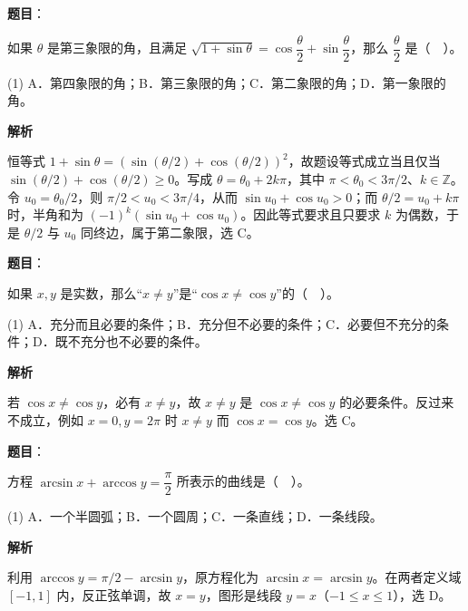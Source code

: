 \begin{answer}

\textbf{题目}：

如果 $\theta$ 是第三象限的角，且满足 $\sqrt{1+\sin\theta}=\cos\dfrac\theta2+\sin\dfrac\theta2$，那么 $\dfrac\theta2$ 是（　）。

\begin{gkopts}(1)
\task A．第四象限的角；B．第三象限的角；C．第二象限的角；D．第一象限的角。
\end{gkopts}

\textbf{解析}

恒等式 $1+\sin\theta=(\sin(\theta/2)+\cos(\theta/2))^2$，故题设等式成立当且仅当 $\sin(\theta/2)+\cos(\theta/2)\ge0$。写成 $\theta=\theta_0+2k\pi$，其中 $\pi<\theta_0<3\pi/2$、$k\in\mathbb Z$。令 $u_0=\theta_0/2$，则 $\pi/2<u_0<3\pi/4$，从而 $\sin u_0+\cos u_0>0$；而 $\theta/2=u_0+k\pi$ 时，半角和为 $(-1)^k(\sin u_0+\cos u_0)$。因此等式要求且只要求 $k$ 为偶数，于是 $\theta/2$ 与 $u_0$ 同终边，属于第二象限，选 C。


\end{answer}
\begin{answer}

\textbf{题目}：

如果 $x,y$ 是实数，那么“$x\ne y$”是“$\cos x\ne\cos y$”的（　）。

\begin{gkopts}(1)
\task A．充分而且必要的条件；B．充分但不必要的条件；C．必要但不充分的条件；D．既不充分也不必要的条件。
\end{gkopts}

\textbf{解析}

若 $\cos x\ne\cos y$，必有 $x\ne y$，故 $x\ne y$ 是 $\cos x\ne\cos y$ 的必要条件。反过来不成立，例如 $x=0,y=2\pi$ 时 $x\ne y$ 而 $\cos x=\cos y$。选 C。


\end{answer}
\begin{answer}

\textbf{题目}：

方程 $\arcsin x+\arccos y=\dfrac\pi2$ 所表示的曲线是（　）。

\begin{gkopts}(1)
\task A．一个半圆弧；B．一个圆周；C．一条直线；D．一条线段。
\end{gkopts}

\textbf{解析}

利用 $\arccos y=\pi/2-\arcsin y$，原方程化为 $\arcsin x=\arcsin y$。在两者定义域 $[-1,1]$ 内，反正弦单调，故 $x=y$，图形是线段 $y=x$（$-1\le x\le1$），选 D。


\end{answer}
